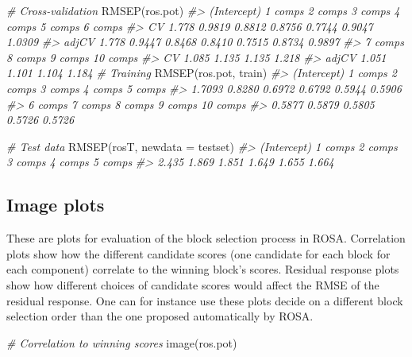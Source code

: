 \documentclass[
]{article}
\newenvironment{Shaded}{\begin{snugshade}}{\end{snugshade}}
\newcommand{\AttributeTok}[1]{\textcolor[rgb]{0.77,0.63,0.00}{#1}}
\newcommand{\CommentTok}[1]{\textcolor[rgb]{0.56,0.35,0.01}{\textit{#1}}}
\newcommand{\FunctionTok}[1]{\textcolor[rgb]{0.00,0.00,0.00}{#1}}
\newcommand{\NormalTok}[1]{#1}
\newcommand{\StringTok}[1]{\textcolor[rgb]{0.31,0.60,0.02}{#1}}
\begin{document}
\begin{Shaded}
\begin{Highlighting}[]
\CommentTok{\# Cross{-}validation}
\FunctionTok{RMSEP}\NormalTok{(ros.pot)}
\CommentTok{\#\textgreater{}        (Intercept)  1 comps  2 comps  3 comps  4 comps  5 comps  6 comps}
\CommentTok{\#\textgreater{} CV           1.778   0.9819   0.8812   0.8756   0.7744   0.9047   1.0309}
\CommentTok{\#\textgreater{} adjCV        1.778   0.9447   0.8468   0.8410   0.7515   0.8734   0.9897}
\CommentTok{\#\textgreater{}        7 comps  8 comps  9 comps  10 comps}
\CommentTok{\#\textgreater{} CV       1.085    1.135    1.135     1.218}
\CommentTok{\#\textgreater{} adjCV    1.051    1.101    1.104     1.184}
\CommentTok{\# Training}
\FunctionTok{RMSEP}\NormalTok{(ros.pot, }\StringTok{\textquotesingle{}train\textquotesingle{}}\NormalTok{)}
\CommentTok{\#\textgreater{} (Intercept)      1 comps      2 comps      3 comps      4 comps      5 comps  }
\CommentTok{\#\textgreater{}      1.7093       0.8280       0.6972       0.6792       0.5944       0.5906  }
\CommentTok{\#\textgreater{}     6 comps      7 comps      8 comps      9 comps     10 comps  }
\CommentTok{\#\textgreater{}      0.5877       0.5879       0.5805       0.5726       0.5726}

\CommentTok{\# Test data}
\FunctionTok{RMSEP}\NormalTok{(rosT, }\AttributeTok{newdata =}\NormalTok{ testset)}
\CommentTok{\#\textgreater{} (Intercept)      1 comps      2 comps      3 comps      4 comps      5 comps  }
\CommentTok{\#\textgreater{}       2.435        1.869        1.851        1.649        1.655        1.664}
\end{Highlighting}
\end{Shaded}

\hypertarget{image-plots}{%
\subsection{Image plots}\label{image-plots}}

These are plots for evaluation of the block selection process in ROSA.
Correlation plots show how the different candidate scores (one candidate
for each block for each component) correlate to the winning block's
scores. Residual response plots show how different choices of candidate
scores would affect the RMSE of the residual response. One can for
instance use these plots decide on a different block selection order
than the one proposed automatically by ROSA.

\begin{Shaded}
\begin{Highlighting}[]
\CommentTok{\# Correlation to winning scores}
\FunctionTok{image}\NormalTok{(ros.pot)}
\end{Highlighting}
\end{Shaded}
\end{document}
